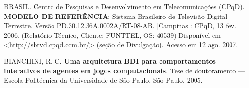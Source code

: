 \begin{thebibliography}{99}

    BRASIL. {C}entro de {P}esquisas e {D}esenvolvimento em {T}elecomunicações ({CPqD}).
    \textbf{MODELO DE REFERÊNCIA}: Sistema Brasileiro de Televisão Digital Terrestre.
    Versão PD.30.12.36A.0002A/RT-08-AB.
    [Campinas]: CPqD, 13 fev. 2006.
    (Relatório Técnico, Cliente: FUNTTEL, OS: 40539)
    Disponível em <\url{http://sbtvd.cpqd.com.br/}> (seção de Divulgação).
    Acesso em 12 ago. 2007.


    BIANCHINI, R. C. \textbf{Uma arquitetura BDI para comportamentos interativos de agentes em jogos computacionais}. Tese de doutoramento --- Escola Politécnica da Universidade de São Paulo, São Paulo, 2005.

\end{thebibliography}

